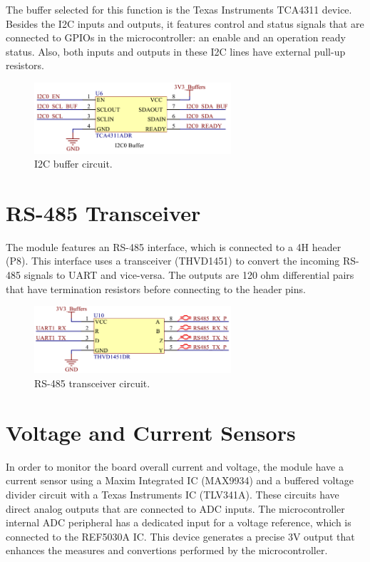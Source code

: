 The buffer selected for this function is the Texas Instruments TCA4311 device. Besides the I2C inputs and outputs, it features control and status signals that are connected to GPIOs in the microcontroller: an enable and an operation ready status. Also, both inputs and outputs in these I2C lines have external pull-up resistors.

\begin{figure}[!ht]
    \begin{center}
        \includegraphics[width=0.65\textwidth]{figures/i2c-buffer-circuit.png}
        \caption{I2C buffer circuit.}
        \label{fig:i2c-buffer-circuit}
    \end{center}
\end{figure}

\section{RS-485 Transceiver}

The module features an RS-485 interface, which is connected to a 4H header (P8). This interface uses a transceiver (THVD1451) to convert the incoming RS-485 signals to UART and vice-versa. The outputs are 120 ohm differential pairs that have termination resistors before connecting to the header pins.

\begin{figure}[!ht]
    \begin{center}
        \includegraphics[width=0.65\textwidth]{figures/rs485-transceiver-circuit.png}
        \caption{RS-485 transceiver circuit.}
        \label{fig:rs485-transceiver-circuit}
    \end{center}
\end{figure}

\section{Voltage and Current Sensors}

In order to monitor the board overall current and voltage, the module have a current sensor using a Maxim Integrated IC (MAX9934) and a buffered voltage divider circuit with a Texas Instruments IC (TLV341A). These circuits have direct analog outputs that are connected to ADC inputs. The microcontroller internal ADC peripheral has a dedicated input for a voltage reference, which is connected to the REF5030A IC. This device generates a precise 3V output that enhances the measures and convertions performed by the microcontroller.

